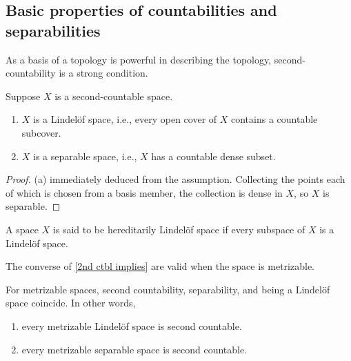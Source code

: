 \subsection{Basic properties of countabilities and separabilities}

As a basis of a topology is powerful in describing the topology, second-countability is a strong condition.
\begin{prop}\label{2nd ctbl implies}
    Suppose $X$ is a second-countable space.
    \begin{enumerate}
        \item[(a)]
        {
            $X$ is a Lindel\"of space, i.e., every open cover of $X$ contains a countable subcover.
        }
        \item[(b)]
        {
            $X$ is a separable space, i.e., $X$ has a countable dense subset.
        }
    \end{enumerate}
\end{prop}
\begin{proof}
    (a) immediately deduced from the assumption.
    Collecting the points each of which is chosen from a basis member, the collection is dense in $X$, so $X$ is separable.
\end{proof}
\begin{rmk}
    A space $X$ is said to be hereditarily Lindel\"of space if every subspace of $X$ is a Lindel\"of space.
\end{rmk}
The converse of \cref{2nd ctbl implies} are valid when the space is metrizable.
\begin{prop}
    For metrizable spaces, second countability, separability, and being a Lindel\"{o}f space coincide.
    In other words,
    \begin{enumerate}
        \item[(a)]
        {
            every metrizable Lindel\"{o}f space is second countable.
        }
        \item[(b)]
        {
            every metrizable separable space is second countable.
        }
    \end{enumerate}
\end{prop}
